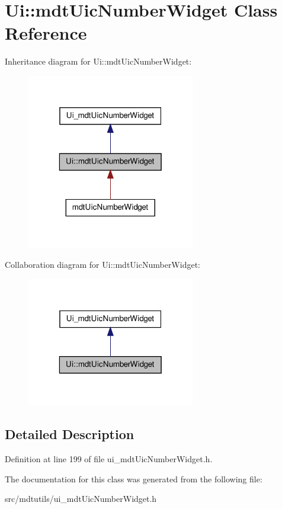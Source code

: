 \hypertarget{class_ui_1_1mdt_uic_number_widget}{
\section{Ui::mdtUicNumberWidget Class Reference}
\label{class_ui_1_1mdt_uic_number_widget}
}


Inheritance diagram for Ui::mdtUicNumberWidget:\nopagebreak
\begin{figure}[H]
\begin{center}
\leavevmode
\includegraphics[width=208pt]{class_ui_1_1mdt_uic_number_widget__inherit__graph}
\end{center}
\end{figure}


Collaboration diagram for Ui::mdtUicNumberWidget:\nopagebreak
\begin{figure}[H]
\begin{center}
\leavevmode
\includegraphics[width=208pt]{class_ui_1_1mdt_uic_number_widget__coll__graph}
\end{center}
\end{figure}


\subsection{Detailed Description}


Definition at line 199 of file ui\_\-mdtUicNumberWidget.h.



The documentation for this class was generated from the following file:\begin{DoxyCompactItemize}
\item 
src/mdtutils/ui\_\-mdtUicNumberWidget.h\end{DoxyCompactItemize}
